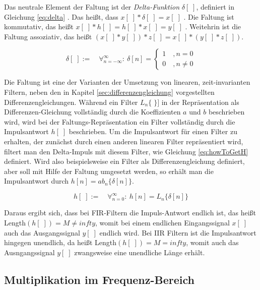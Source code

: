 Das neutrale Element der Faltung ist der \emph{Delta-Funktion} $\delta[\;]$, definiert in Gleichung \ref{eq:delta} . Das heißt, dass $x[\;] * \delta[\;] = x[\;]$ . Die Faltung ist kommutativ, das heißt $ x[\;]* h[\;] = h[\;] * x[\;] = y[\;]$ . \cite[S. 107, 113 ]{dspGuide} Weitehrin ist die Faltung assoziativ, das heißt $(x[\;]*y[\;])*z[\;]=x[\;]*(y[\;]*z[\;])$. \cite[S. 133]{dspGuide}

\begin{equation}
\delta [\;] := \quad \mathop{\forall}_{n = -\infty}^{\infty} :\ \delta[n] = 
\begin{cases}
1 \quad , n = 0\\
0 \quad ,  n \neq 0
\label{eq:delta}
\end{cases}
\end{equation}

Die Faltung ist eine der Varianten der Umsetzung von linearen, zeit-invarianten Filtern, neben den in Kapitel \ref{sec:differenzengleichung} vorgestellten Differenzengleichungen. Während ein Filter $L_n\{\;\}]$ in der Repräsentation  als Differenzen-Gleichung vollständig durch die Koeffizienten $a$ und $b$ beschrieben wird, wird bei der Faltungs-Repräsentation ein Filter vollständig durch die Impulsantwort $h[\;]$ beschrieben. Um die Impulsantwort für einen Filter zu erhalten, der zunächst durch einen anderen linearen Filter repräsentiert wird,  filtert man den Delta-Impuls mit diesem Filter, wie Gleichung \ref{eq:howToGetH} definiert. Wird also beispielsweise ein Filter als Differenzengleichung definiert, aber soll mit Hilfe der Faltung umgesetzt werden, so erhält man die Impulsantwort durch $h[n] = ab_n\{\delta[n]\}$.\cite[Impulse-Response Representation ]{introductionToFilters}

\begin{equation}
h[\;] := \quad \mathop{\forall}_{n = 0}^{\infty} :\ h[n] = L_n\{\delta[n]\}
\label{eq:howToGetH}
\end{equation}

Daraus ergibt sich, dass bei FIR-Filtern die Impuls-Antwort endlich ist, das heißt Length$(h[\;]) = M \neq infty$, womit bei einem endlichen Eingangssignal $x[\;]$ auch das Ausgangssignal $y[\;]$ endlich wird. Bei IIR Filtern ist die Impulsantwort hingegen unendlich, da heißt  Length$(h[\;]) = M = infty$, womit auch das Ausngangssignal $y[\;]$ zwangsweise eine unendliche Länge erhält. \cite[\glqq The Finite in FIR\grqq]{introductionToFilters}

\subsection{Multiplikation im Frequenz-Bereich}

